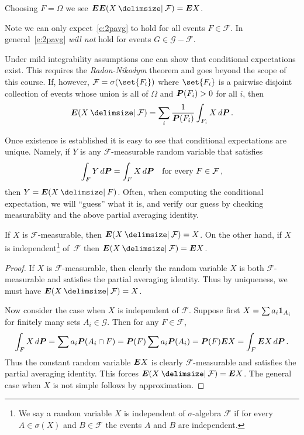 \begin{remark}
  Choosing $F = \Omega$ we see $\E \E(X\given \mathcal F) = \E X$.
\end{remark}
\begin{remark}
  Note we can only expect~\eqref{e:2pavg} to hold for all events $F \in \mathcal F$.
  In general~\eqref{e:2pavg} \emph{will not} hold for events $G \in \mathcal G - \mathcal F$.
\end{remark}
\begin{remark}
  Under mild integrability assumptions one can show that conditional expectations exist.
  This requires the \emph{Radon-Nikodym} theorem and goes beyond the scope of this course.
  If, however, $\mathcal F = \sigma( \set{F_i} )$ where $\set{F_i}$ is a pairwise disjoint collection of events whose union is all of $\Omega$ and $\P(F_i) > 0 $ for all $i$, then
  \begin{equation*}
    \E( X \given \mathcal F)
      = \sum_i \frac{1}{\P(F_i)} \int_{F_i} X \, d\P \,.
  \end{equation*}
\end{remark}
\begin{remark}
  Once existence is established it is easy to see that conditional expectations are unique.
  Namely, if $Y$ is any $\mathcal F$-measurable random variable that satisfies
  \begin{equation*}
    \int_F Y \, d\P = \int_F X \, d\P
    \quad\text{for every } F \in \mathcal F\,,
  \end{equation*}
  then $Y = \E( X \given F)$.
  Often, when computing the conditional expectation, we will ``guess'' what it is, and verify our guess by checking measurablity and the above partial averaging identity. 
\end{remark}
\begin{proposition}
If $X$ is $\mathcal F$-measurable, then $\E(X \given \mathcal F) = X$.
On the other hand, if $X$ is independent\footnote{%
  We say a random variable $X$ is independent of $\sigma$-algebra $\mathcal F$ if for every $A \in \sigma(X)$ and $B \in \mathcal F$ the events $A$ and $B$ are independent.%
}
of~$\mathcal F$ then $\E( X \given \mathcal F) = \E X$.
\end{proposition}
\begin{proof}
  If $X$ is $\mathcal F$-measurable, then clearly the random variable $X$ is both $\mathcal F$-measurable and satisfies the partial averaging identity.
  Thus by uniqueness, we must have $\E( X \given \mathcal F) = X$.
  
  Now consider the case when $X$ is independent of $\mathcal F$.
  Suppose first $X = \sum a_i \one_{A_i}$ for finitely many sets $A_i \in \mathcal G$.
  Then for any $F \in \mathcal F$,
  \begin{equation*}
    \int_F X \, d\P
      = \sum a_i \P( A_i \cap F )
      = \P(F) \sum a_i \P(A_i)
      = \P(F) \E X
      = \int_F \E X \, d\P\,.
  \end{equation*}
  Thus the constant random variable $\E X$ is clearly $\mathcal F$-measurable and satisfies the partial averaging identity.
  This forces $\E( X \given \mathcal F) = \E X$.
  The general case when $X$ is not simple follows by approximation.
\end{proof}

